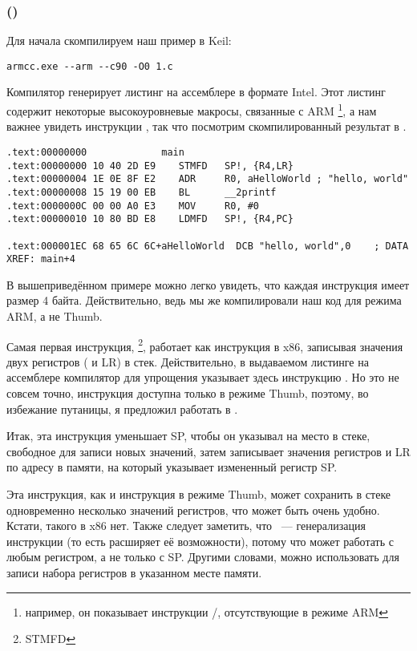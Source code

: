 \subsubsection{\NonOptimizingKeilVI (\ARMMode)}

Для начала скомпилируем наш пример в Keil:

\begin{lstlisting}
armcc.exe --arm --c90 -O0 1.c 
\end{lstlisting}

\myindex{\IntelSyntax}
Компилятор  генерирует листинг на ассемблере в формате Intel.
Этот листинг содержит некоторые высокоуровневые макросы, связанные с ARM
\footnote{например, он показывает инструкции \PUSH/\POP, отсутствующие в режиме ARM},
а нам важнее увидеть инструкции , так что посмотрим скомпилированный результат в \IDA.

\begin{lstlisting}[caption=\NonOptimizingKeilVI (\ARMMode) \IDA,style=customasmARM]
.text:00000000             main
.text:00000000 10 40 2D E9    STMFD   SP!, {R4,LR}
.text:00000004 1E 0E 8F E2    ADR     R0, aHelloWorld ; "hello, world"
.text:00000008 15 19 00 EB    BL      __2printf
.text:0000000C 00 00 A0 E3    MOV     R0, #0
.text:00000010 10 80 BD E8    LDMFD   SP!, {R4,PC}

.text:000001EC 68 65 6C 6C+aHelloWorld  DCB "hello, world",0    ; DATA XREF: main+4
\end{lstlisting}

В вышеприведённом примере можно легко увидеть, что каждая инструкция имеет размер 4 байта.
Действительно, ведь мы же компилировали наш код для режима ARM, а не Thumb.

Самая первая инструкция, \footnote{\ac{STMFD}},
работает как инструкция \PUSH в x86, записывая значения двух регистров ( и \ac{LR}) в стек.
Действительно, в выдаваемом листинге на ассемблере компилятор  для упрощения указывает здесь инструкцию
.
Но это не совсем точно, инструкция \PUSH доступна только в режиме Thumb, поэтому,
во избежание путаницы, я предложил работать в \IDA.

Итак, эта инструкция уменьшает \ac{SP}, чтобы он указывал на место в стеке, свободное для записи
новых значений, затем записывает значения регистров  и \ac{LR} 
по адресу в памяти, на который указывает измененный регистр \ac{SP}.

Эта инструкция, как и инструкция \PUSH в режиме Thumb, может сохранить в стеке одновременно несколько значений регистров, что может быть очень удобно.
Кстати, такого в x86 нет.
Также следует заметить, что ~--- генерализация инструкции \PUSH (то есть расширяет её возможности), потому что может работать с любым регистром, а не только с \ac{SP}.
Другими словами,  можно использовать для записи набора регистров в указанном месте памяти.

